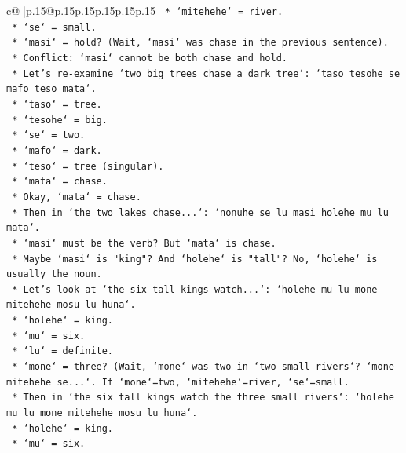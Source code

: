 \documentclass{article}
\begin{document}
{\begin{supertabular}{c@{$\;$}|p{.15\linewidth}@{}p{.15\linewidth}p{.15\linewidth}p{.15\linewidth}p{.15\linewidth}p{.15\linewidth}}
{{{\texttt{            *   `mitehehe` = river.} \\
\texttt{            *   `se` = small.} \\
\texttt{            *   `masi` = hold? (Wait, `masi` was chase in the previous sentence).} \\
\texttt{            *   Conflict: `masi` cannot be both chase and hold.} \\
\texttt{            *   Let's re{-}examine `two big trees chase a dark tree`: `taso tesohe se mafo teso mata`.} \\
\texttt{                *   `taso` = tree.} \\
\texttt{                *   `tesohe` = big.} \\
\texttt{                *   `se` = two.} \\
\texttt{                *   `mafo` = dark.} \\
\texttt{                *   `teso` = tree (singular).} \\
\texttt{                *   `mata` = chase.} \\
\texttt{            *   Okay, `mata` = chase.} \\
\texttt{            *   Then in `the two lakes chase...`: `nonuhe se lu masi holehe mu lu mata`.} \\
\texttt{                *   `masi` must be the verb? But `mata` is chase.} \\
\texttt{                *   Maybe `masi` is "king"? And `holehe` is "tall"? No, `holehe` is usually the noun.} \\
\texttt{                *   Let's look at `the six tall kings watch...`: `holehe mu lu mone mitehehe mosu lu huna`.} \\
\texttt{                    *   `holehe` = king.} \\
\texttt{                    *   `mu` = six.} \\
\texttt{                    *   `lu` = definite.} \\
\texttt{                    *   `mone` = three? (Wait, `mone` was two in `two small rivers`? `mone mitehehe se...`. If `mone`=two, `mitehehe`=river, `se`=small.} \\
\texttt{                    *   Then in `the six tall kings watch the three small rivers`: `holehe mu lu mone mitehehe mosu lu huna`.} \\
\texttt{                        *   `holehe` = king.} \\
\texttt{                        *   `mu` = six.} \\
}}}
\end{supertabular}}
\end{document}
